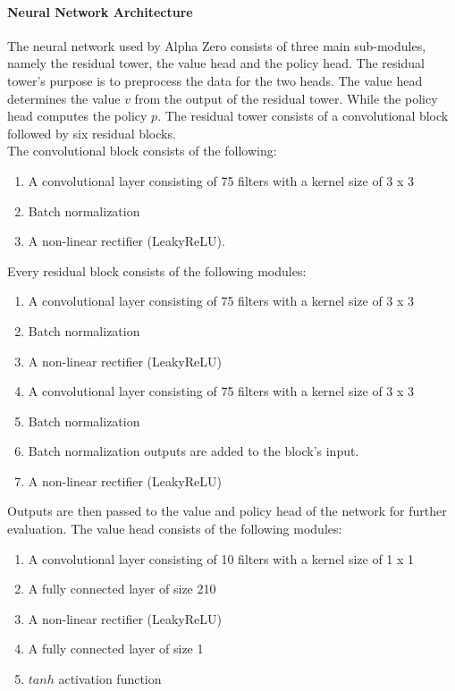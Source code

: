\documentclass[12pt]{article}
\begin{document}
\paragraph{Neural Network Architecture} 
\label{sec:NeruralNetworkArchitecture}
The neural network used by Alpha Zero consists of three main sub-modules, namely the residual tower, the value head and the policy head. The residual tower's purpose is to preprocess the data for the two heads. The value head determines the value \(v\) from the output of the residual tower. While the policy head computes the policy \(p\). The residual tower consists of a convolutional block followed by six residual blocks.\\
The convolutional block consists of the following: 
\begin{enumerate}
\item A convolutional layer consisting of 75 filters with a kernel size of 3 x 3
\item Batch normalization \cite{ioffe2015batch}
\item A non-linear rectifier (LeakyReLU).
\end{enumerate}
Every residual block consists of the following modules:
\begin{enumerate}
\item A convolutional layer consisting of 75 filters with a kernel size of 3 x 3
\item Batch normalization \cite{ioffe2015batch}
\item A non-linear rectifier (LeakyReLU)
\item A convolutional layer consisting of 75 filters with a kernel size of 3 x 3
\item Batch normalization \cite{ioffe2015batch}
\item Batch normalization outputs are added to the block's input.
\item A non-linear rectifier (LeakyReLU)
\end{enumerate}
Outputs are then passed to the value and policy head of the network for further evaluation.
The value head consists of the following modules:
\begin{enumerate}
\item A convolutional layer consisting of 10 filters with a kernel size of 1 x 1
\item A fully connected layer of size 210
\item A non-linear rectifier (LeakyReLU)
\item A fully connected layer of size 1
\item \(tanh\) activation function
\end{enumerate}
\end{document}
